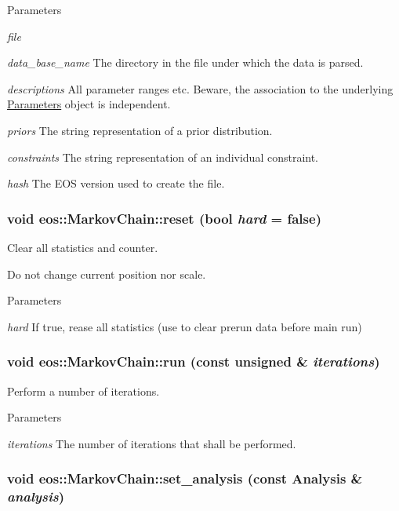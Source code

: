 \begin{DoxyParams}{Parameters}
\item[{\em file}]\item[{\em data\_\-base\_\-name}]The directory in the file under which the data is parsed. \item[{\em descriptions}]All parameter ranges etc. Beware, the association to the underlying \hyperlink{classeos_1_1Parameters}{Parameters} object is independent. \item[{\em priors}]The string representation of a prior distribution. \item[{\em constraints}]The string representation of an individual constraint. \item[{\em hash}]The EOS version used to create the file. \end{DoxyParams}
\hypertarget{classeos_1_1MarkovChain_a4e54cc6e32c7bb258804b76988ab7f0b}{
\subsubsection[{reset}]{\setlength{\rightskip}{0pt plus 5cm}void eos::MarkovChain::reset (bool {\em hard} = {\ttfamily false})}}
\label{classeos_1_1MarkovChain_a4e54cc6e32c7bb258804b76988ab7f0b}
Clear all statistics and counter.

Do not change current position nor scale. 
\begin{DoxyParams}{Parameters}
\item[{\em hard}]If true, rease all statistics (use to clear prerun data before main run) \end{DoxyParams}
\hypertarget{classeos_1_1MarkovChain_abc73ca1b9fc5bdafba43c799e75192c8}{
\subsubsection[{run}]{\setlength{\rightskip}{0pt plus 5cm}void eos::MarkovChain::run (const unsigned \& {\em iterations})}}
\label{classeos_1_1MarkovChain_abc73ca1b9fc5bdafba43c799e75192c8}
Perform a number of iterations.


\begin{DoxyParams}{Parameters}
\item[{\em iterations}]The number of iterations that shall be performed. \end{DoxyParams}
\hypertarget{classeos_1_1MarkovChain_a808902afe1f1c7def764c4c492e29f1d}{
\subsubsection[{set\_\-analysis}]{\setlength{\rightskip}{0pt plus 5cm}void eos::MarkovChain::set\_\-analysis (const {\bf Analysis} \& {\em analysis})}}
\label{classeos_1_1MarkovChain_a808902afe1f1c7def764c4c492e29f1d}


